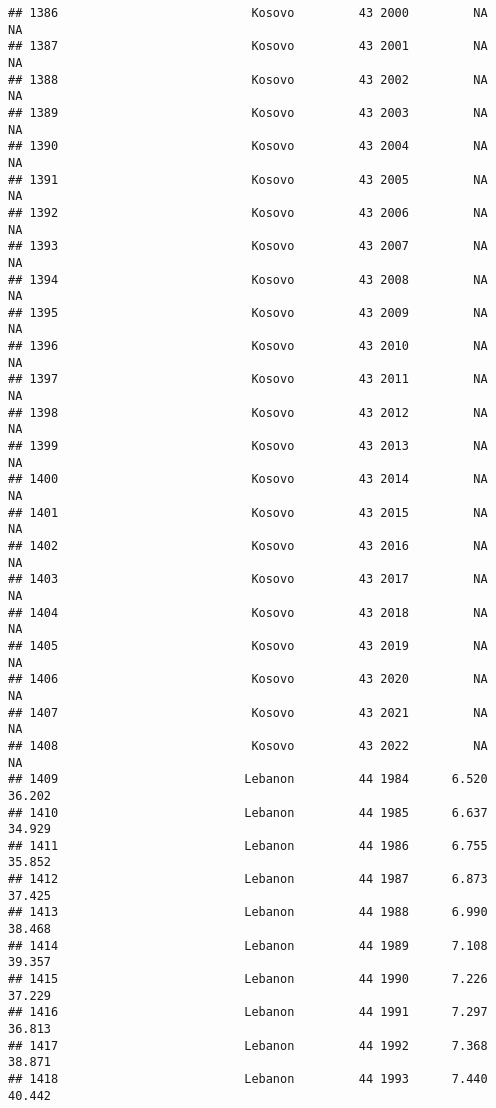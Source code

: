 \documentclass[
]{article}
\begin{document}
\begin{verbatim}
## 1386                           Kosovo         43 2000         NA         NA
## 1387                           Kosovo         43 2001         NA         NA
## 1388                           Kosovo         43 2002         NA         NA
## 1389                           Kosovo         43 2003         NA         NA
## 1390                           Kosovo         43 2004         NA         NA
## 1391                           Kosovo         43 2005         NA         NA
## 1392                           Kosovo         43 2006         NA         NA
## 1393                           Kosovo         43 2007         NA         NA
## 1394                           Kosovo         43 2008         NA         NA
## 1395                           Kosovo         43 2009         NA         NA
## 1396                           Kosovo         43 2010         NA         NA
## 1397                           Kosovo         43 2011         NA         NA
## 1398                           Kosovo         43 2012         NA         NA
## 1399                           Kosovo         43 2013         NA         NA
## 1400                           Kosovo         43 2014         NA         NA
## 1401                           Kosovo         43 2015         NA         NA
## 1402                           Kosovo         43 2016         NA         NA
## 1403                           Kosovo         43 2017         NA         NA
## 1404                           Kosovo         43 2018         NA         NA
## 1405                           Kosovo         43 2019         NA         NA
## 1406                           Kosovo         43 2020         NA         NA
## 1407                           Kosovo         43 2021         NA         NA
## 1408                           Kosovo         43 2022         NA         NA
## 1409                          Lebanon         44 1984      6.520     36.202
## 1410                          Lebanon         44 1985      6.637     34.929
## 1411                          Lebanon         44 1986      6.755     35.852
## 1412                          Lebanon         44 1987      6.873     37.425
## 1413                          Lebanon         44 1988      6.990     38.468
## 1414                          Lebanon         44 1989      7.108     39.357
## 1415                          Lebanon         44 1990      7.226     37.229
## 1416                          Lebanon         44 1991      7.297     36.813
## 1417                          Lebanon         44 1992      7.368     38.871
## 1418                          Lebanon         44 1993      7.440     40.442

\end{verbatim}
\end{document}
